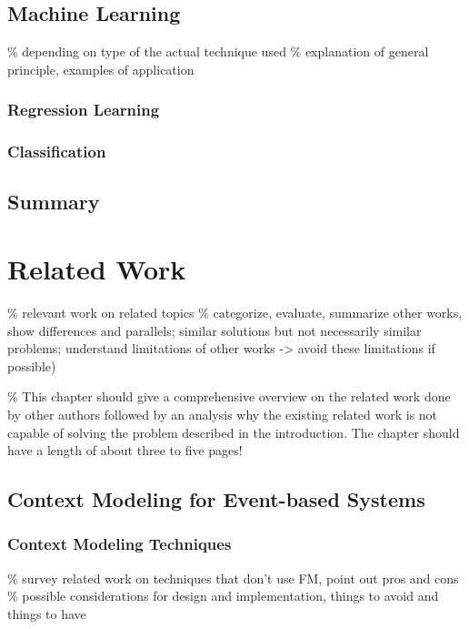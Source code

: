 \section{Machine Learning}
\% depending on type of the actual technique used
\% explanation of general principle, examples of application
\subsection{Regression Learning}
\subsection{Classification}

\section{Summary}


\chapter{Related Work}
\% relevant work on related topics
\% categorize, evaluate, summarize other works, show differences and parallels; similar solutions but not necessarily similar problems; understand limitations of other works -> avoid these limitations if possible)

\% This chapter should give a comprehensive overview on the related work done by other authors followed by an analysis why the existing related work is not capable of solving the problem described in the introduction. The chapter should have a length of about three to five pages!

\section{Context Modeling for Event-based Systems}

\subsection{Context Modeling Techniques}
\% survey related work on techniques that don't use FM, point out pros and cons
\% possible considerations for design and implementation, things to avoid and things to have

